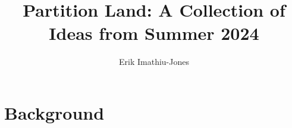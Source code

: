 \documentclass[11pt]{article}
\title{Partition Land: A Collection of Ideas from Summer 2024}
\author{Erik Imathiu-Jones}
\begin{document}

\newpage
\section{Background}


\tableofcontents
\newpage


\end{document}

